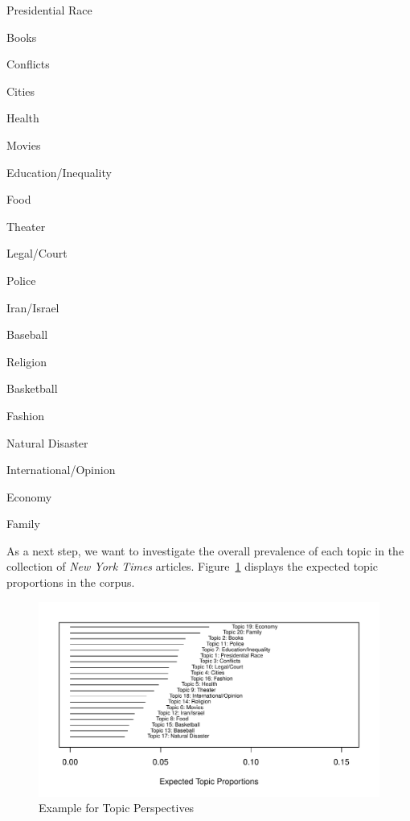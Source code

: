 \documentclass[12pt]{article}
\begin{document}
\begin{doublespace}
\begin{enumerate}\singlespacing
\begin{multicols}{2}
\item Presidential Race \item Books \item Conflicts \item Cities  \item Health 
\item Movies \item Education/Inequality \item Food \item Theater \item Legal/Court 
\columnbreak
\item Police \item Iran/Israel \item Baseball \item Religion \item Basketball 
\item Fashion \item Natural Disaster \item International/Opinion \item Economy \item Family
\end{multicols}
\end{enumerate}

As a next step, we want to investigate the overall prevalence of each topic in the collection of \textit{New York Times} articles. Figure~\ref{fig:prop} displays the expected topic proportions in the corpus.

\begin{figure}
\caption{Example for Topic Perspectives}\label{fig:prop}
\includegraphics[width=\textwidth]{../calc/fig/prop} 
\end{figure}


\end{doublespace}
\end{document}
